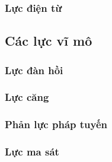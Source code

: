 \begin{frame}
\frametitle{Lực điện từ}
\end{frame}
\subsection{Các lực vĩ mô}
\begin{frame}
    \frametitle{Lực đàn hồi}
\end{frame}
\begin{frame}
    \frametitle{Lực căng}
\end{frame}
\begin{frame}
    \frametitle{Phản lực pháp tuyến}
\end{frame}
\begin{frame}
    \frametitle{Lực ma sát}
\end{frame}